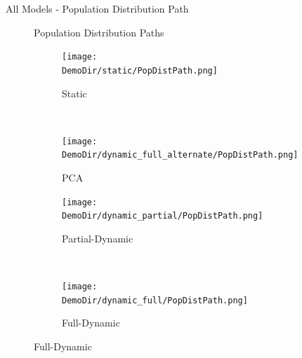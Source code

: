 \documentclass[12pt]{beamer}
\newcommand*{\DemoDir}{../code/Rick/OUTPUT/Demographics}
\begin{document}
\begin{frame}{All Models - Population Distribution Path}

	\begin{figure}[H]
		Population Distribution Paths
		\begin{subfigure}{0.5\textwidth}
			\centering
			\texttt{[image: \\DemoDir/static/PopDistPath.png]}
			\vspace{-5mm}
			\caption{Static}
		\end{subfigure}%
		~ %
		\begin{subfigure}{0.5\textwidth}
			\centering
			\texttt{[image: \\DemoDir/dynamic\_full\_alternate/PopDistPath.png]}
			\vspace{-5mm}
			\caption{PCA}
		\end{subfigure}%
		\newline
		\begin{subfigure}{0.5\textwidth}
			\centering
			\texttt{[image: \\DemoDir/dynamic\_partial/PopDistPath.png]}
			\vspace{-5mm}
			\caption{Partial-Dynamic}
		\end{subfigure}%
		~ %
		\begin{subfigure}{0.5\textwidth}
			\centering
			\texttt{[image: \\DemoDir/dynamic\_full/PopDistPath.png]}
			\vspace{-5mm}
			\caption{Full-Dynamic}
		\end{subfigure}%
	\end{figure}

\end{frame}
\end{document}
